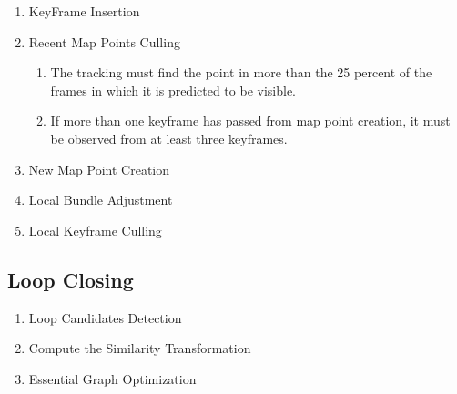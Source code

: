 \documentclass{article}
\begin{document}
\begin{enumerate}
\item KeyFrame Insertion
\item Recent Map Points Culling
	\begin{enumerate}
	\item The tracking must find the point in more than the 25 percent of the frames in which it is predicted to be visible.
	\item If more than one keyframe has passed from map point creation, it must be observed from at least three keyframes.
	\end{enumerate}
\item New Map Point Creation
\item Local Bundle Adjustment
\item Local Keyframe Culling
\end{enumerate}

\subsection{Loop Closing}

\begin{enumerate}
\item Loop Candidates Detection
\item Compute the Similarity Transformation
\item Essential Graph Optimization
\end{enumerate}
\end{document}
